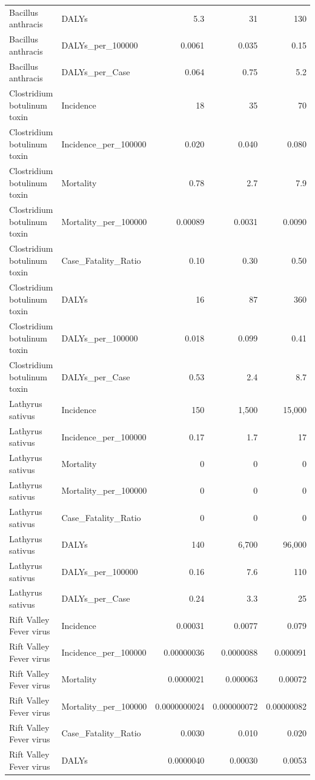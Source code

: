 \documentclass[
  letterpaper,
  DIV=11,
  numbers=noendperiod]{scrartcl}
\begin{document}
\begin{table}
{\begin{tabular*}{\linewidth}{@{\extracolsep{\fill}}llrrr}
Bacillus anthracis & DALYs & 5.3 & 31 & 130 \\ 
Bacillus anthracis & DALYs\_per\_100000 & 0.0061 & 0.035 & 0.15 \\ 
Bacillus anthracis & DALYs\_per\_Case & 0.064 & 0.75 & 5.2 \\ 
Clostridium botulinum toxin & Incidence & 18 & 35 & 70 \\ 
Clostridium botulinum toxin & Incidence\_per\_100000 & 0.020 & 0.040 & 0.080 \\ 
Clostridium botulinum toxin & Mortality & 0.78 & 2.7 & 7.9 \\ 
Clostridium botulinum toxin & Mortality\_per\_100000 & 0.00089 & 0.0031 & 0.0090 \\ 
Clostridium botulinum toxin & Case\_Fatality\_Ratio & 0.10 & 0.30 & 0.50 \\ 
Clostridium botulinum toxin & DALYs & 16 & 87 & 360 \\ 
Clostridium botulinum toxin & DALYs\_per\_100000 & 0.018 & 0.099 & 0.41 \\ 
Clostridium botulinum toxin & DALYs\_per\_Case & 0.53 & 2.4 & 8.7 \\ 
Lathyrus sativus & Incidence & 150 & 1,500 & 15,000 \\ 
Lathyrus sativus & Incidence\_per\_100000 & 0.17 & 1.7 & 17 \\ 
Lathyrus sativus & Mortality & 0 & 0 & 0 \\ 
Lathyrus sativus & Mortality\_per\_100000 & 0 & 0 & 0 \\ 
Lathyrus sativus & Case\_Fatality\_Ratio & 0 & 0 & 0 \\ 
Lathyrus sativus & DALYs & 140 & 6,700 & 96,000 \\ 
Lathyrus sativus & DALYs\_per\_100000 & 0.16 & 7.6 & 110 \\ 
Lathyrus sativus & DALYs\_per\_Case & 0.24 & 3.3 & 25 \\ 
Rift Valley Fever virus & Incidence & 0.00031 & 0.0077 & 0.079 \\ 
Rift Valley Fever virus & Incidence\_per\_100000 & 0.00000036 & 0.0000088 & 0.000091 \\ 
Rift Valley Fever virus & Mortality & 0.0000021 & 0.000063 & 0.00072 \\ 
Rift Valley Fever virus & Mortality\_per\_100000 & 0.0000000024 & 0.000000072 & 0.00000082 \\ 
Rift Valley Fever virus & Case\_Fatality\_Ratio & 0.0030 & 0.010 & 0.020 \\ 
Rift Valley Fever virus & DALYs & 0.0000040 & 0.00030 & 0.0053 \\ 

\end{tabular*}}
\end{table}
\end{document}
